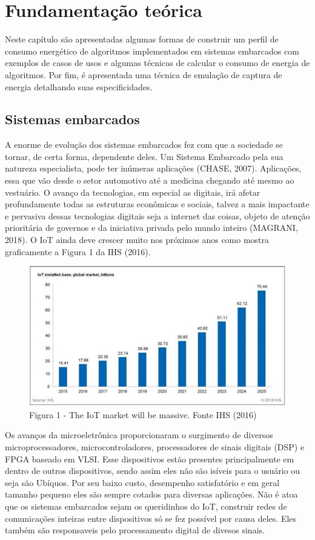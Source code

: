 \chapter{Fundamentação teórica}
\label{CAP2}


Neste capítulo são apresentadas algumas formas de construir um perfil de consumo energético de algoritmos implementados em sistemas embarcados com exemplos de casos de usos e algumas técnicas de calcular o consumo de energia de algoritmos. Por fim, é apresentada uma técnica de emulação de captura de energia detalhando suas especificidades.


\section{Sistemas embarcados}
 A enorme de evolução dos sistemas embarcados fez com que a sociedade se tornar, de certa forma, dependente deles. Um Sistema Embarcado pela sua natureza especialista, pode ter inúmeras aplicações (CHASE, 2007). Aplicações, essa que vão desde o setor automotivo até a medicina chegando até mesmo ao vestuário. O avanço da tecnologias, em especial as digitais, irá afetar profundamente todas as estruturas econômicas e sociais, talvez a mais impactante e pervasiva dessas tecnologias digitais seja
a internet das coisas, objeto de atenção prioritária de governos e da iniciativa privada pelo mundo inteiro (MAGRANI, 2018).  O IoT ainda deve crescer muito nos próximos anos como mostra graficamente a Figura 1 da IHS (2016).  
\begin{figure}[!ht]
\centering
\includegraphics[scale=.65]{figures/grafico.jpg}
\caption{ Figura 1 - The IoT market will be massive. Fonte IHS (2016) } \label{Fig:1}
\end{figure}

Os avanços da microeletrônica proporcionaram o surgimento de diversos microprocessadores, microcontroladores, processadores de sinais digitais (DSP) e FPGA baseado em VLSI. Esse dispositivos estão presentes principalmente em dentro de outros dispositivos, sendo assim eles não são isíveis para o usuário ou seja são Ubíquos. Por seu baixo custo, desempenho satisfatório e em geral tamanho pequeno eles são sempre cotados para diversas aplicações. Não é atoa que os sistemas embarcados sejam os queridinhos do IoT, construir redes de comunicações inteiras entre dispositivos só se fez possível por causa deles. Eles também são responsaveis pelo processamento digital de divesos sinais.           



